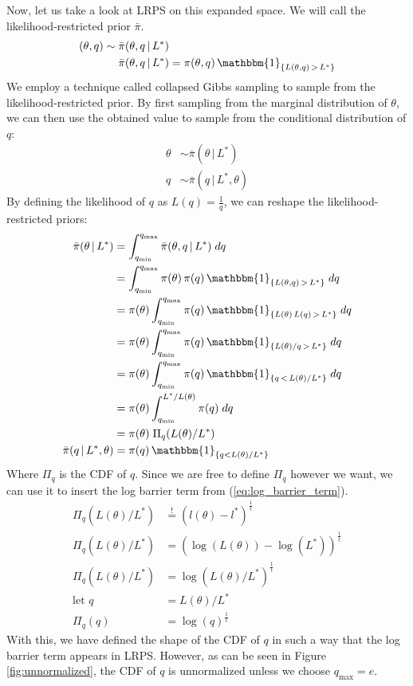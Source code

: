 \documentclass[12pt, a4paper]{report}
\begin{document}
Now, let us take a look at LRPS on this expanded space.
We will call the likelihood-restricted prior $\bar{\pi}$.
\begin{align*}
    (\theta,q) \sim \; &\bar{\pi}(\theta, q \,|\, L^*) \\
    &\bar{\pi}(\theta, q \,|\, L^*) = \pi(\theta, q) \, \mathbbm{1}_{\{L(\theta, q) \, > \, L^*\}}
\end{align*}
We employ a technique called collapsed Gibbs sampling \cite{collapsed_gibbs} to sample from the likelihood-restricted prior.
By first sampling from the marginal distribution of $\theta$, we can then use the obtained value to sample from the conditional distribution of $q$:
\begin{align*}
    \theta &\sim  \bar{\pi}(\theta \,|\, L^*) \\
    q &\sim  \bar{\pi}(q \,|\, L^*, \theta)
\end{align*}
By defining the likelihood of $q$ as $L(q) = \frac{1}{q}$, we can reshape the likelihood-restricted priors:
\begin{align*}
    \bar{\pi}(\theta \,|\, L^*) &= \int_{q_{\textrm{min}}}^{q_{\textrm{max}}} \bar{\pi}(\theta, q \,|\, L^*) \; dq \\
    &= \int_{q_{\textrm{min}}}^{q_{\textrm{max}}} \pi(\theta) \, \pi(q) \, \mathbbm{1}_{\{L(\theta, q) \,>\, L^*\}} \; dq \\
    &= \pi(\theta) \int_{q_{\textrm{min}}}^{q_{\textrm{max}}} \pi(q) \, \mathbbm{1}_{\{L(\theta) \, L(q) \,>\, L^*\}} \; dq \\
    &= \pi(\theta) \int_{q_{\textrm{min}}}^{q_{\textrm{max}}} \pi(q) \, \mathbbm{1}_{\{L(\theta) / q \,>\, L^*\}} \; dq \\
    &= \pi(\theta) \int_{q_{\textrm{min}}}^{q_{\textrm{max}}} \pi(q) \, \mathbbm{1}_{\{q \,<\, L(\theta) / L^*\}} \; dq \\
    &= \pi(\theta) \int_{q_{\textrm{min}}}^{L^* / L(\theta)} \pi(q) \; dq \\
    &= \pi(\theta) \; \Pi_q(L(\theta) / L^*) \\
    \bar{\pi}(q \,|\, L^*, \theta) &= \pi(q) \, \mathbbm{1}_{\{q < L(\theta) / L^*\}}
\end{align*}
Where $\Pi_q$ is the CDF of $q$.
Since we are free to define $\Pi_q$ however we want, we can use it to insert the log barrier term from (\ref{eq:log_barrier_term}).
\begin{align*}
    \Pi_q(L(\theta) / L^*) &\overset{!}{=} (l(\theta) - l^*)^{\frac{1}{t}} \\
    \Pi_q(L(\theta) / L^*) &=(\log(L(\theta)) - \log(L^*))^{\frac{1}{t}} \\
    \Pi_q(L(\theta) / L^*) &= \log(L(\theta) / L^*)^{\frac{1}{t}} \\
    \textrm{let } q &= L(\theta) / L^* \\
    \Pi_q(q) &= \log(q)^{\frac{1}{t}}
\end{align*}
With this, we have defined the shape of the CDF of $q$ in such a way that the log barrier term appears in LRPS.
However, as can be seen in Figure \ref{fig:unnormalized}, the CDF of $q$ is unnormalized unless we choose $q_{\textrm{max}}=e$.
\end{document}
